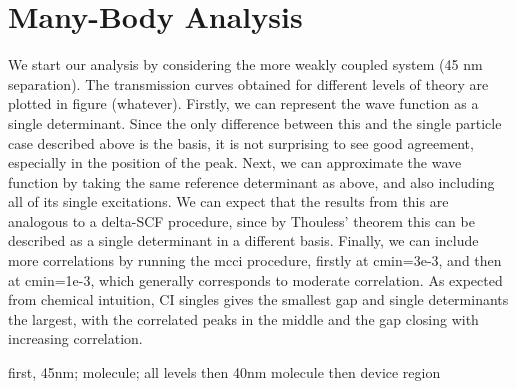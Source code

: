 \section{Many-Body Analysis}

We start our analysis by considering the more weakly coupled system (45
nm separation). The transmission curves obtained for different levels of
theory are plotted in figure (whatever). Firstly, we can represent the
wave function as a single determinant. Since the only difference between
this and the single particle case described above is the basis, it is not
surprising to see good agreement, especially in the position of the peak.
Next, we can approximate the wave function by taking the same reference
determinant as above, and also including all of its single excitations.
We can expect that the results from this are analogous to a delta-SCF
procedure, since by Thouless' theorem this can be described as a single
determinant in a different basis. Finally, we can include more correlations
by running the mcci procedure, firstly at cmin=3e-3, and then at cmin=1e-3,
which generally corresponds to moderate correlation. As expected from
chemical intuition, CI singles gives the smallest gap and single
determinants the largest, with the correlated peaks in the middle and the
gap closing with increasing correlation.


first, 45nm; molecule; all levels
then 40nm molecule
then device region
